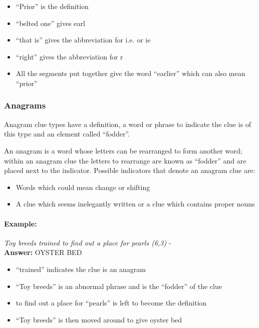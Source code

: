 \begin{itemize}
  \item ``Prior'' is the definition 
  \item ``belted one'' gives earl 
  \item ``that is'' gives the abbreviation for i.e. or ie 
  \item ``right'' gives the abbreviation for r 
  \item All the segments put together give the word ``earlier'' which can also 
        mean ``prior''
\end{itemize}


\subsubsection{Anagrams}

Anagram clue types have a definition, a word or phrase to indicate the clue is
of this type and an element called ``fodder''.

An anagram is a word whose letters can be rearranged to form another word;
within an anagram clue the letters to rearrange are known as ``fodder'' and are
placed next to the indicator. Possible indicators that denote an anagram clue 
are:

\begin{itemize} 
  \item Words which could mean change or shifting 
  \item A clue which seems inelegantly written or a clue which contains proper 
        nouns
\end{itemize}

\paragraph{Example:} \emph{Toy breeds trained to find out a place for pearls (6,3)} - \citep{shuchiAnagram08} \\
\textbf{Answer:} OYSTER BED 

\begin{itemize}
  \item ``trained'' indicates the clue is an anagram   
  \item ``Toy breeds'' is an abnormal phrase and is the ``fodder'' of the clue 
  \item to find out a place for ``pearls'' is left to become the definition 
  \item ``Toy breeds'' is then moved around to give oyster bed 
\end{itemize}


